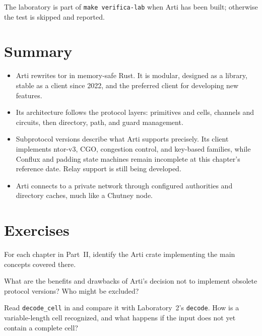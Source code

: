 The laboratory is part of \texttt{make verifica-lab} when Arti has been built; otherwise the test is skipped and reported.

\section*{Summary}
\begin{itemize}
  \item Arti rewrites tor in memory-safe Rust. It is modular, designed as a library, stable as a client since 2022, and the preferred client for developing new features.
  \item Its architecture follows the protocol layers: primitives and cells, channels and circuits, then directory, path, and guard management.
  \item Subprotocol versions describe what Arti supports precisely. Its client implements ntor-v3, CGO, congestion control, and key-based families, while Conflux and padding state machines remain incomplete at this chapter's reference date. Relay support is still being developed.
  \item Arti connects to a private network through configured authorities and directory caches, much like a Chutney node.
\end{itemize}

\section*{Exercises}

\begin{esercizio}[1]\label{es:30-crate}
For each chapter in Part~II, identify the Arti crate implementing the main concepts covered there.
\end{esercizio}

\begin{esercizio}[1]\label{es:30-obsoleto}
What are the benefits and drawbacks of Arti's decision not to implement obsolete protocol versions? Who might be excluded?
\end{esercizio}

\begin{esercizio}[2]\label{es:30-cella}
Read \texttt{decode\_cell} in  and compare it with Laboratory~2's \texttt{decode}. How is a variable-length cell recognized, and what happens if the input does not yet contain a complete cell?
\end{esercizio}

